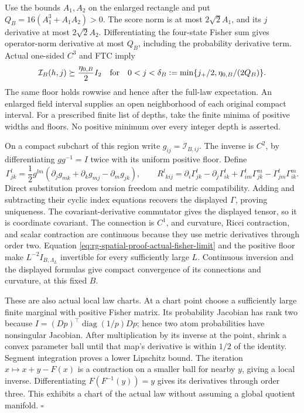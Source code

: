 Use the bounds \(A_1,A_2\) on the enlarged rectangle and put
\(Q_B=16(A_1^3+A_1A_2)>0\). The score norm is at most
\(2\sqrt2 A_1\), and its \(j\) derivative at most
\(2\sqrt2 A_2\). Differentiating the four-state Fisher sum gives
operator-norm derivative at most \(Q_B\), including the probability
derivative term. Actual one-sided \(C^3\) and FTC imply
\begin{equation}
 \mathcal I_B(h,j)\succeq\frac{\eta_{0,B}}2 I_2
 \quad\hbox{for}\quad
 0<j<\delta_B:=\min\{j_+/2,\eta_{0,B}/(2Q_B)\}.
 \label{eq:rg-spatial-proof-regular-fisher-region}
\end{equation}
The same floor holds rowwise and hence after the full-law expectation.
An enlarged field interval supplies an open neighborhood of each original
compact interval. For a prescribed finite list of depths, take the finite
minima of positive widths and floors. No positive minimum over every
integer depth is asserted.

On a compact subchart of this region write \(g_{ij}=\mathcal I_{B,ij}\).
The inverse is \(C^2\), by differentiating \(gg^{-1}=I\) twice with its
uniform positive floor. Define
\begin{equation}
 \Gamma^l_{jk}=\frac12 g^{lm}
        (\partial_jg_{mk}+\partial_kg_{mj}-\partial_mg_{jk}),\qquad
 R^l{}_{kij}=\partial_i\Gamma^l_{jk}-\partial_j\Gamma^l_{ik}
             +\Gamma^l_{im}\Gamma^m_{jk}-\Gamma^l_{jm}\Gamma^m_{ik}.
 \label{eq:rg-spatial-proof-fisher-connection-curvature}
\end{equation}
Direct substitution proves torsion freedom and metric compatibility.
Adding and subtracting their cyclic index equations recovers the displayed
\(\Gamma\), proving uniqueness. The covariant-derivative commutator
gives the displayed tensor, so it is coordinate covariant. The connection
is \(C^1\), and curvature, Ricci contraction, and scalar contraction are
continuous because they use metric derivatives through order two.
Equation \cref{eq:rg-spatial-proof-actual-fisher-limit} and the positive
floor make \(L^{-2}I_{B,\Lambda_L}\) invertible for every sufficiently
large \(L\). Continuous inversion and the displayed formulas give compact
convergence of its connections and curvature, at this fixed \(B\).

These are also actual local law charts. At a chart point choose a
sufficiently large finite marginal with positive Fisher matrix. Its
probability Jacobian has rank two because
\(I=(Dp)^\top\operatorname{diag}(1/p)Dp\); hence two atom probabilities
have nonsingular Jacobian. After multiplication by its inverse at the
point, shrink a convex parameter ball until that map's derivative is
within \(1/2\) of the identity. Segment integration proves a lower
Lipschitz bound. The iteration \(x\mapsto x+y-F(x)\) is a contraction
on a smaller ball for nearby \(y\), giving a local inverse.
Differentiating \(F(F^{-1}(y))=y\) gives its derivatives through order
three. This exhibits a chart of the actual law without assuming a global
quotient manifold. \hfill\(\square\)

